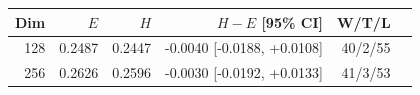 \begin{tabular}{@{}rrrrrr@{}}
\toprule
Dim & $E$ & $H$ & $H-E$ [95\% CI] & W/T/L \\
\midrule
128 & 0.2487 & 0.2447 & -0.0040 [-0.0188, +0.0108] & 40/2/55 \\
256 & 0.2626 & 0.2596 & -0.0030 [-0.0192, +0.0133] & 41/3/53 \\
\bottomrule
\end{tabular}
